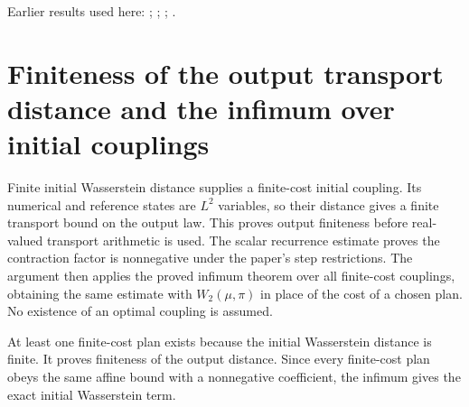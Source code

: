\documentclass[11pt,a4paper]{article}
\begin{document}
Earlier results used here: \cite[Section~3.17.1]{LangevinLean2026ULASC}; \cite[Section~3.17.2]{LangevinLean2026ULASC}; \cite[Section~3.17.4]{LangevinLean2026ULASC}; \cite[Section~3.22.23]{LangevinLean2026ULASC}.

\section{\texorpdfstring{Finiteness of the output transport distance and the infimum over initial couplings}{Finiteness of the output transport distance and the infimum over initial couplings}}


Finite initial Wasserstein distance supplies a finite-cost initial coupling. Its numerical and reference states are \(L^{2}\) variables, so their distance gives a finite transport bound on the output law. This proves output finiteness before real-valued transport arithmetic is used. The scalar recurrence estimate proves the contraction factor is nonnegative under the paper's step restrictions. The argument then applies the proved infimum theorem over all finite-cost couplings, obtaining the same estimate with \(W_2(\mu,\pi)\) in place of the cost of a chosen plan. No existence of an optimal coupling is assumed.



At least one finite-cost plan exists because the initial Wasserstein distance is finite. It proves finiteness of the output distance. Since every finite-cost plan obeys the same affine bound with a nonnegative coefficient, the infimum gives the exact initial Wasserstein term.
\end{document}
